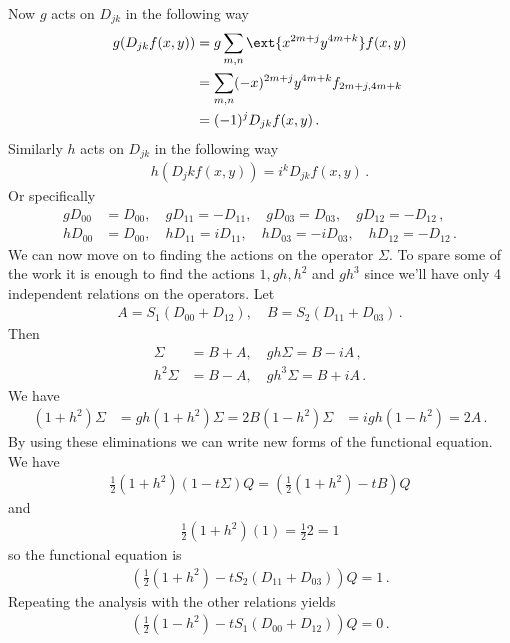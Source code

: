 Now $g$ acts on $D_{jk}$ in the following way
\begin{align}\begin{split}
	g(D_{jk}f(x,y)) &= g\sum_{m,n}\ext{x^{2m+j}y^{4m+k}}f(x,y)\\
			    &= \sum_{m,n}(-x)^{2m+j}y^{4m+k}f_{2m+j,4m+k}\\
			    &=(-1)^jD_{jk}f(x,y)\,.
\end{split}\end{align}
Similarly $h$ acts on $D_{jk}$ in the following way
\begin{align}
	h(D_jk f(x,y)) = i^k D_{jk} f(x,y)\,.
\end{align}
Or specifically
\begin{align*}
	g D_{00} &= D_{00},\quad gD_{11} = -D_{11},\quad g D_{03} = D_{03},\quad  g D_{12} = -D_{12}\,,\\
	h D_{00} &= D_{00},\quad hD_{11} = iD_{11},\quad h D_{03} =-i D_{03},\quad  h D_{12} = -D_{12}\,.
\end{align*}
We can now move on to finding the actions on the operator $\Sigma$. To spare some of the work it is enough to find the actions $1,gh,h^2$ and $gh^3$ since we'll have only 4 independent relations on the operators. Let 
\begin{align}
	A = S_1(D_{00} + D_{12}),\quad B = S_2(D_{11}+D_{03})\,.
\end{align}
Then
\begin{align}
	\Sigma &= B+ A ,\quad gh\Sigma = B-iA\,,\\
	h^2\Sigma &= B - A ,\quad gh^3\Sigma =B+ iA\,.
\end{align}
We have
\begin{align}
	(1+h^2)\Sigma &= gh(1+h^2)\Sigma = 2 B
	(1-h^2)\Sigma &= igh(1-h^2) = 2A\,.
\end{align}
By using these eliminations we can write new forms of the functional equation. We have
\begin{align}
	\frac{1}{2}(1+h^2)(1-t\Sigma)Q = \left(\frac{1}{2}(1+h^2)-tB\right)Q
\end{align}
and
\begin{align}
	\frac{1}{2}(1+h^2)(1) = \frac{1}{2}2 = 1
\end{align}
so the functional equation is
\begin{align}
	\left(\frac{1}{2}(1+h^2)-tS_2(D_{11}+D_{03})\right)Q = 1\,.
\end{align}
Repeating the analysis with the other relations yields
\begin{align}
	\left(\frac{1}{2}(1-h^2)-tS_1(D_{00}+D_{12})\right)Q = 0\,.
\end{align}

